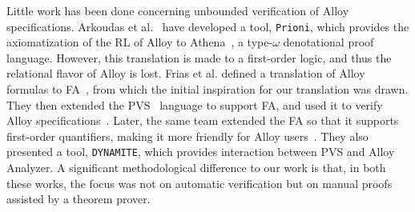 \documentclass{llncs}
\begin{document}
Little work has been done concerning unbounded verification of Alloy
specifications. Arkoudas et al.~\cite{prioni} have developed a tool,
\texttt{Prioni}, which provides the axiomatization of the RL of Alloy
to Athena~\cite{athena}, a type-$\omega$ denotational proof
language. However, this translation is made to a first-order logic,
and thus the relational flavor of Alloy is lost. Frias et al. defined
a translation of Alloy formulas to FA~\cite{eqalloy}, from which the
initial inspiration for our translation was drawn. They then extended
the PVS~\cite{pvs} language to support FA, and used it to verify Alloy
specifications~\cite{friasall2}. Later, the same team extended the FA
so that it supports first-order quantifiers, making it more friendly
for Alloy users~\cite{dynamite}. They also presented a tool,
\texttt{DYNAMITE}, which provides interaction between PVS and Alloy
Analyzer. A significant methodological difference to our work is that,
in both these works, the focus was not on automatic verification but on
manual proofs assisted by a theorem prover.
\end{document}
